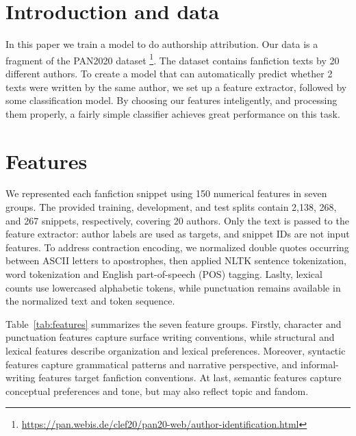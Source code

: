 \documentclass[11pt,twocolumn]{article}
\begin{document}

\section{Introduction and data}
In this paper we train a model to do authorship attribution. Our data is a fragment of the PAN2020 dataset \footnote{\href{https://pan.webis.de/clef20/pan20-web/author-identification.html}{https://pan.webis.de/clef20/pan20-web/author-identification.html}}. The dataset contains fanfiction texts by 20 different authors. To create a model that can automatically predict whether 2 texts were written by the same author, we set up a feature extractor, followed by some classification model. By choosing our features inteligently, and processing them properly, a fairly simple classifier achieves great performance on this task.

\section{Features}

We represented each fanfiction snippet using 150 numerical features in seven groups. The provided training, development, and test splits contain 2,138, 268, and 267 snippets, respectively, covering 20 authors. Only the text is passed to the feature extractor: author labels are used as targets, and snippet IDs are not input features. To address contraction encoding, we normalized double quotes occurring between ASCII letters to apostrophes, then applied NLTK sentence tokenization, word tokenization and English part-of-speech (POS) tagging. Laslty, lexical counts use lowercased alphabetic tokens, while punctuation remains available in the normalized text and token sequence.

Table~\ref{tab:features} summarizes the seven feature groups. Firstly, character and punctuation features capture surface writing conventions, while structural and lexical features describe organization and lexical preferences. Moreover, syntactic features capture grammatical patterns and narrative perspective, and informal-writing features target fanfiction conventions. At last, semantic features capture conceptual preferences and tone, but may also reflect topic and fandom.
\end{document}
